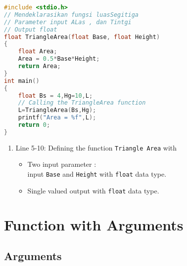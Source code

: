 \begin{lstlisting}[language=c]
	#include <stdio.h>
// Mendeklarasikan fungsi luasSegitiga
// Parameter input ALas , dan Tintgi
// Output float
float TriangleArea(float Base, float Height)
{
	float Area;
	Area = 0.5*Base*Height;
	return Area;
}
int main()
{
	float Bs = 4,Hg=10,L;
    // Calling the TriangleArea function
	L=TriangleArea(Bs,Hg);
	printf("Area = %f",L);
	return 0;
}
\end{lstlisting}
\begin{enumerate}
	\item Line 5-10: Defining the function \verb|Triangle Area| with %
	\begin{itemize}
		\item Two input parameter :\\
	input \verb*|Base| and \verb*|Height|  with \verb*|float| data type.
	    \item Single valued output with \verb*|float| data type.
    \end{itemize}
\end{enumerate}
\section{Function with Arguments}
\subsection{Arguments}


